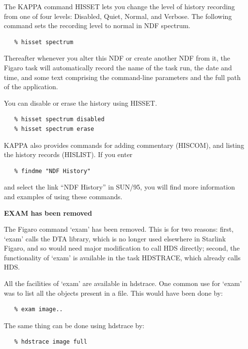 \documentclass[11pt,twoside]{article}
\begin{document}
   The KAPPA command HISSET lets you change the level of history
   recording from one of four levels: Disabled, Quiet, Normal,
   and Verbose.  The following command sets the recording level
   to normal in NDF spectrum.

\begin{verbatim}
   % hisset spectrum
\end{verbatim}

   Thereafter whenever you alter this NDF or create another NDF
   from it, the Figaro task will automatically record the name of
   the task run, the date and time, and some text comprising the
   command-line parameters and the full path of the application.

   You can disable or erase the history using HISSET.

\begin{verbatim}
   % hisset spectrum disabled
   % hisset spectrum erase
\end{verbatim}

   KAPPA also provides commands for adding commentary (HISCOM),
   and listing the history records (HISLIST).  If you enter

\begin{verbatim}
   % findme "NDF History"
\end{verbatim}

   and select the link ``NDF History'' in SUN/95, you will find
   more information and examples of using these commands.


{\bf    EXAM has been removed}

   The Figaro command `exam' has been removed.  This is for two
   reasons: first, `exam' calls the DTA library, which is no longer
   used elsewhere in Starlink Figaro, and so would need major
   modification to call HDS directly; second, the functionality of
   `exam' is available in the task HDSTRACE, which already calls HDS.

   All the facilities of `exam' are available in hdstrace.  One
   common use for `exam' was to list all the objects present in a
   file.  This would have been done by:

\begin{verbatim}
   % exam image..
\end{verbatim}

   The same thing can be done using hdstrace by:

\begin{verbatim}
   % hdstrace image full
\end{verbatim}
\end{document}
